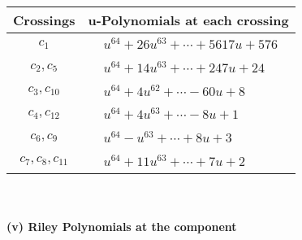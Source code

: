 \documentclass[1p]{elsarticle_modified}
\theoremstyle{definition}
\begin{document}
\begin{tabular}{m{50pt}|m{274pt}}
Crossings & \hspace{64pt}u-Polynomials at each crossing \\
\hline $$\begin{aligned}c_{1}\end{aligned}$$&$\begin{aligned}
&u^{64}+26 u^{63}+\cdots+5617 u+576
\end{aligned}$\\
\hline $$\begin{aligned}c_{2},c_{5}\end{aligned}$$&$\begin{aligned}
&u^{64}+14 u^{63}+\cdots+247 u+24
\end{aligned}$\\
\hline $$\begin{aligned}c_{3},c_{10}\end{aligned}$$&$\begin{aligned}
&u^{64}+4 u^{62}+\cdots-60 u+8
\end{aligned}$\\
\hline $$\begin{aligned}c_{4},c_{12}\end{aligned}$$&$\begin{aligned}
&u^{64}+4 u^{63}+\cdots-8 u+1
\end{aligned}$\\
\hline $$\begin{aligned}c_{6},c_{9}\end{aligned}$$&$\begin{aligned}
&u^{64}- u^{63}+\cdots+8 u+3
\end{aligned}$\\
\hline $$\begin{aligned}c_{7},c_{8},c_{11}\end{aligned}$$&$\begin{aligned}
&u^{64}+11 u^{63}+\cdots+7 u+2
\end{aligned}$\\
\hline
\end{tabular}\\~\\
\newpage\renewcommand{\arraystretch}{1}
\flushleft \textbf{(v) Riley Polynomials at the component}\newline \\
\end{document}
